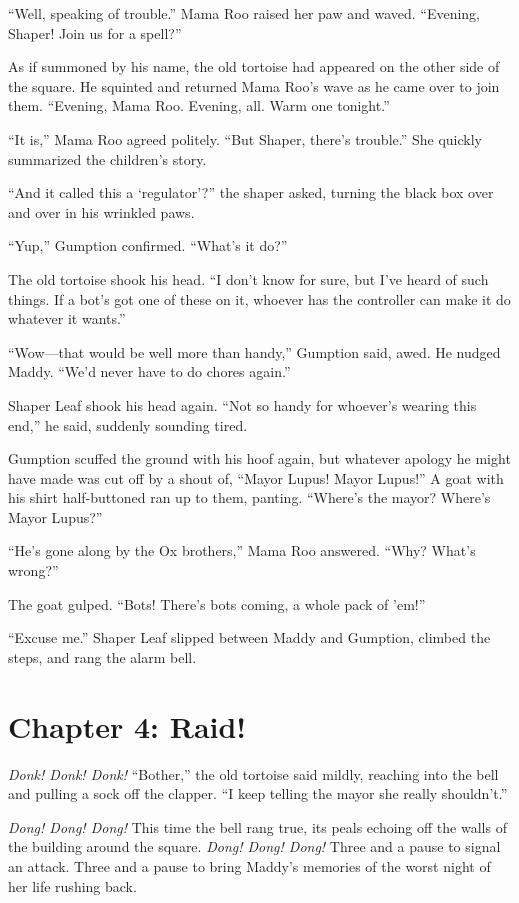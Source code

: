 \documentclass[10pt]{article}
\begin{document}
``Well, speaking of trouble.'' Mama Roo raised her paw and waved.
``Evening, Shaper! Join us for a spell?''

As if summoned by his name, the old tortoise had appeared on the other
side of the square. He squinted and returned Mama Roo's wave as he came
over to join them. ``Evening, Mama Roo. Evening, all. Warm one
tonight.''

``It is,'' Mama Roo agreed politely. ``But Shaper, there's trouble.''
She quickly summarized the children's story.

``And it called this a `regulator'?'' the shaper asked, turning the
black box over and over in his wrinkled paws.

``Yup,'' Gumption confirmed. ``What's it do?''

The old tortoise shook his head. ``I don't know for sure, but I've heard
of such things. If a bot's got one of these on it, whoever has the
controller can make it do whatever it wants.''

``Wow---that would be well more than handy,'' Gumption said, awed. He
nudged Maddy. ``We'd never have to do chores again.''

Shaper Leaf shook his head again. ``Not so handy for whoever's wearing
this end,'' he said, suddenly sounding tired.

Gumption scuffed the ground with his hoof again, but whatever apology he
might have made was cut off by a shout of, ``Mayor Lupus! Mayor Lupus!''
A goat with his shirt half-buttoned ran up to them, panting. ``Where's
the mayor? Where's Mayor Lupus?''

``He's gone along by the Ox brothers,'' Mama Roo answered. ``Why? What's
wrong?''

The goat gulped. ``Bots! There's bots coming, a whole pack of 'em!''

``Excuse me.'' Shaper Leaf slipped between Maddy and Gumption, climbed
the steps, and rang the alarm bell.

\newpage
\section{Chapter 4: Raid!}

\emph{Donk! Donk! Donk!} ``Bother,'' the old tortoise said mildly,
reaching into the bell and pulling a sock off the clapper. ``I keep
telling the mayor she really shouldn't.''

\emph{Dong! Dong! Dong!} This time the bell rang true, its peals echoing
off the walls of the building around the square. \emph{Dong! Dong!
Dong!} Three and a pause to signal an attack. Three and a pause to bring
Maddy's memories of the worst night of her life rushing back.
\end{document}
